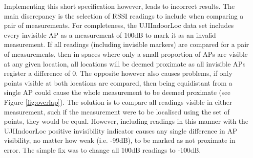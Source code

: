\documentclass{UoYCSproject}
\begin{document}
            Implementing this short specification however, leads to incorrect results. The main discrepancy is the selection of RSSI readings to include when comparing a pair of measurements. For completeness, the UJIIndoorLoc data set includes every invisible AP as a measurement of 100dB to mark it as an invalid measurement. If all readings (including invisible markers) are compared for a pair of measurements, then in spaces where only a small proportion of APs are visible at any given location, all locations will be deemed proximate as all invisible APs register a difference of $0$. The opposite however also causes problems, if only points visible at both locations are compared, then being equidistant from a single AP could cause the whole measurement to be deemed proximate (see Figure \ref{fig:overlap}). The solution is to compare all readings visible in either measurement, such if the measurement were to be localised using the set of points, they would be equal. However, including readings in this manner with the UJIIndoorLoc positive invisibility indicator causes any single difference in AP visibility, no matter how weak (i.e. -99dB), to be marked as not proximate in error. The simple fix was to change all 100dB readings to -100dB.
            
\end{document}
